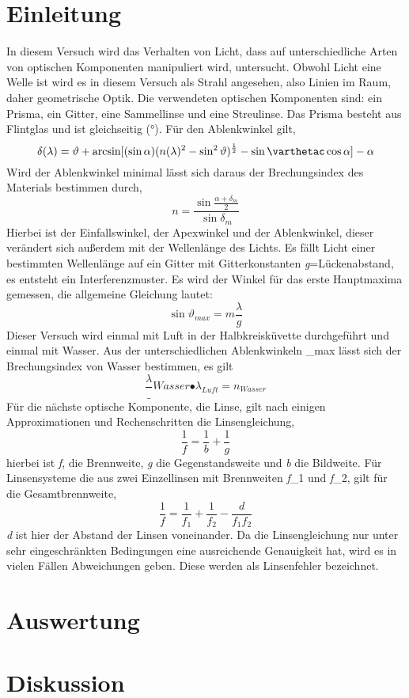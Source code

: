 \section{Einleitung}
In diesem Versuch wird das Verhalten von Licht, dass auf unterschiedliche Arten von optischen Komponenten manipuliert wird, untersucht.
Obwohl Licht eine Welle ist wird es in diesem Versuch als Strahl angesehen, also Linien im Raum, daher geometrische Optik.
Die verwendeten optischen Komponenten sind: ein Prisma, ein Gitter, eine Sammellinse und eine Streulinse.
Das Prisma besteht aus Flintglas und ist gleichseitig (°).
Für den Ablenkwinkel gilt,
\begin{equation}
\delta(\lambda)=\vartheta+\arcsin [(\sin \alpha)(n(\lambda)^{2}-\sin^{2}\vartheta)^{\frac{1}{2}}-\sin\varthetac \cos\alpha]-\alpha \label{eq:delta}
\end{equation}
Wird der Ablenkwinkel minimal lässt sich daraus der Brechungsindex des Materials bestimmen durch,
\begin{equation}
n = \frac{\sin \frac{\alpha + \delta_m}{2}}{\sin \delta_m} \label{eq:brech_pris}
\end{equation}
Hierbei ist \vartheta der Einfallswinkel, \alpha der Apexwinkel und \delta der Ablenkwinkel, dieser verändert sich außerdem mit der Wellenlänge des Lichts.
Es fällt Licht einer bestimmten Wellenlänge \lambda auf ein Gitter mit Gitterkonstanten \textit{g}=Lückenabstand, es entsteht ein Interferenzmuster.
Es wird der Winkel für das erste Hauptmaxima gemessen, die allgemeine Gleichung lautet:
\begin{equation}
\sin\vartheta_{max}=m\frac{\lambda}{g}
\end{equation}
Dieser Versuch wird einmal mit Luft in der Halbkreisküvette durchgeführt und einmal mit Wasser. Aus der unterschiedlichen Ablenkwinkeln \vartheta_{max} lässt sich der Brechungsindex von Wasser bestimmen, es gilt
\begin{equation}
\frac{\lambda}_{Wasser}{•\lambda_{Luft}}=n_{Wasser} \label{Brechungsindex_wasser}
\end{equation}
Für die nächste optische Komponente, die Linse, gilt nach einigen Approximationen und Rechenschritten die Linsengleichung,
\begin{equation}
\frac{1}{f}=\frac{1}{b}+\frac{1}{g} \label{Linsenglg}
\end{equation}
hierbei ist \textit{f}, die Brennweite, \textit{g} die Gegenstandsweite und \textit{b} die Bildweite.
Für Linsensysteme die aus zwei Einzellinsen mit Brennweiten \textit{f}_{1} und \textit{f}_{2}, gilt für die Gesamtbrennweite,
\begin{equation}
\frac{1}{f}=\frac{1}{f_{1}}+\frac{1}{f_{2}}-\frac{d}{f_{1}f_{2}}
\end{equation}
\textit{d} ist hier der Abstand der Linsen voneinander.
Da die Linsengleichung nur unter sehr eingeschränkten Bedingungen eine ausreichende Genauigkeit hat, wird es in vielen Fällen Abweichungen geben. Diese werden als Linsenfehler bezeichnet.
\newpage
\section{Auswertung}

\newpage
\section{Diskussion} 